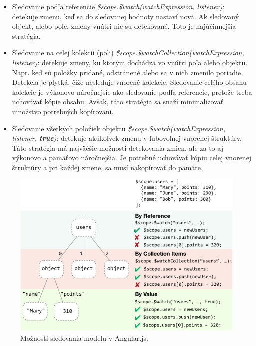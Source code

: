 \begin{itemize}
  \item Sledovanie podľa referencie \textit{\$scope.\$watch(watchExpression, listener)}: detekuje zmenu, keď sa do sledovanej hodnoty nastaví nová. Ak sledovaný objekt, alebo pole, zmeny vnútri nie su detekované. Toto je najúčinnejšia stratégia.
  \item Sledovanie na celej kolekcii (poli) \textit{\$scope.\$watchCollection(watchExpression, listener)}: detekuje zmeny, ku ktorým dochádza vo vnútri poľa alebo objektu. Napr. keď sú položky pridané, odstránené alebo sa v nich zmenilo poriadie. Detekcia je plytká, čiže nesleduje vnorené kolekcie. Sledovanie celého obsahu kolekcie je výkonovo náročnejsie ako sledovanie podľa referencie, pretože treba uchovávať kópie obsahu. Avšak, táto stratégia sa snaží minimalizovať množstvo potrebných kopírovaní.
  \item Sledovanie všetkých položiek objektu \textit{\$scope.\$watch(watchExpression, listener, \textbf{true})}: detekuje akúkoľvek zmenu v ľubovolnej vnorenej štruktúry. Táto stratégia má najväčšie možnosti detekovania zmien, ale za to aj výkonovo a pamäťovo náročnejšia. Je potrebné uchovávať kópiu celej vnorenej štruktúry a pri každej zmene, sa musí nakopírovať do pamäte.
\end{itemize}

\begin{figure}[H]
  \centering
  \includegraphics[scale=0.7]{img/angular/concepts-scope-watch-strategies.png}
  \caption{Možnosti sledovania modelu v Angular.js.}
  \label{img-angular-watchl}
\end{figure}

